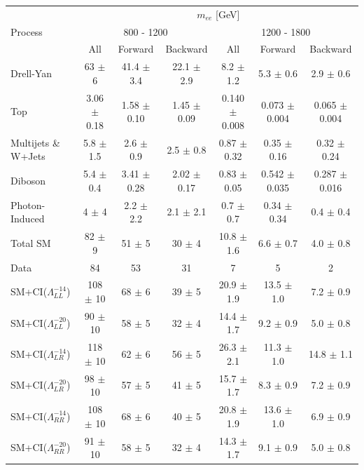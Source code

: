	\begin {table}[h]
		\footnotesize 
		\begin{center}
		\begin{tabular}{  l | c c c | c c c  }	
			\hline
			\hline
			\multirow{3}{*}{Process} 	& \multicolumn{6}{c}{$m_{ee}$ [GeV]} \\
										& \multicolumn{3}{c}{800 - 1200} & \multicolumn{3}{c}{1200 - 1800} \\
										\cline{2-7}
										& All & Forward & Backward & All & Forward & Backward \\
			\hline
			Drell-Yan & 63 $\pm$ 6 & 41.4 $\pm$ 3.4 & 22.1 $\pm$ 2.9 & 8.2 $\pm$ 1.2 & 5.3 $\pm$ 0.6 & 2.9 $\pm$ 0.6 \\
			Top & 3.06 $\pm$ 0.18 & 1.58 $\pm$ 0.10 & 1.45 $\pm$ 0.09 & 0.140 $\pm$ 0.008 & 0.073 $\pm$ 0.004 & 0.065 $\pm$ 0.004 \\
			Multijets \& W+Jets & 5.8 $\pm$ 1.5 & 2.6 $\pm$ 0.9 & 2.5 $\pm$ 0.8 & 0.87 $\pm$ 0.32 & 0.35 $\pm$ 0.16 & 0.32 $\pm$ 0.24 \\
			Diboson & 5.4 $\pm$ 0.4 & 3.41 $\pm$ 0.28 & 2.02 $\pm$ 0.17 & 0.83 $\pm$ 0.05 & 0.542 $\pm$ 0.035 & 0.287 $\pm$ 0.016 \\
			Photon-Induced & 4 $\pm$ 4 & 2.2 $\pm$ 2.2 & 2.1 $\pm$ 2.1 & 0.7 $\pm$ 0.7 & 0.34 $\pm$ 0.34 & 0.4 $\pm$ 0.4 \\
			\hline
			Total SM & 82 $\pm$ 9 & 51 $\pm$ 5 & 30 $\pm$ 4 & 10.8 $\pm$ 1.6 & 6.6 $\pm$ 0.7 & 4.0 $\pm$ 0.8 \\
			\hline
			Data & 84 & 53 & 31 & 7 & 5 & 2 \\
			\hline
			SM+CI($\Lambda^{-14}_{LL}$) & 108 $\pm$ 10 & 68 $\pm$ 6 & 39 $\pm$ 5 & 20.9 $\pm$ 1.9 & 13.5 $\pm$ 1.0 & 7.2 $\pm$ 0.9 \\
			SM+CI($\Lambda^{-20}_{LL}$) & 90 $\pm$ 10 & 58 $\pm$ 5 & 32 $\pm$ 4 & 14.4 $\pm$ 1.7 & 9.2 $\pm$ 0.9 & 5.0 $\pm$ 0.8 \\
			SM+CI($\Lambda^{-14}_{LR}$) & 118 $\pm$ 10 & 62 $\pm$ 6 & 56 $\pm$ 5 & 26.3 $\pm$ 2.1 & 11.3 $\pm$ 1.0 & 14.8 $\pm$ 1.1 \\
			SM+CI($\Lambda^{-20}_{LR}$) & 98 $\pm$ 10 & 57 $\pm$ 5 & 41 $\pm$ 5 & 15.7 $\pm$ 1.7 & 8.3 $\pm$ 0.9 & 7.2 $\pm$ 0.9 \\
			SM+CI($\Lambda^{-14}_{RR}$) & 108 $\pm$ 10 & 68 $\pm$ 6 & 40 $\pm$ 5 & 20.8 $\pm$ 1.9 & 13.6 $\pm$ 1.0 & 6.9 $\pm$ 0.9 \\
			SM+CI($\Lambda^{-20}_{RR}$) & 91 $\pm$ 10 & 58 $\pm$ 5 & 32 $\pm$ 4 & 14.3 $\pm$ 1.7 & 9.1 $\pm$ 0.9 & 5.0 $\pm$ 0.8 \\

\end{tabular}
\end{center}
\end{table}
